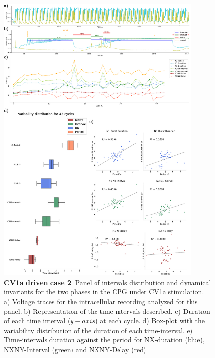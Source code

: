 \begin{figure}[htbp]
	\centering
	\includegraphics[width=0.9\textwidth]{./img/invariants/data/SUSSEX/CV1a_driven2/images/panel_with_intervals.pdf}
	\caption{\textbf{CV1a driven case 2}: Panel of intervals distribution and dynamical invariants for the two phases in the CPG under CV1a stimulation. a) Voltage traces for the intracellular recording analyzed for this panel. b) Representation of the time-intervals described. c) Duration of each time interval ($y-axis$) at each cycle. d) Box-plot with the variability distribution of the duration of each time-interval. e) Time-intervals duration against the period for NX-duration (blue), NXNY-Interval (green) and NXNY-Delay (red)}
	\label{fig:cv1a 2 2phases}
\end{figure}



